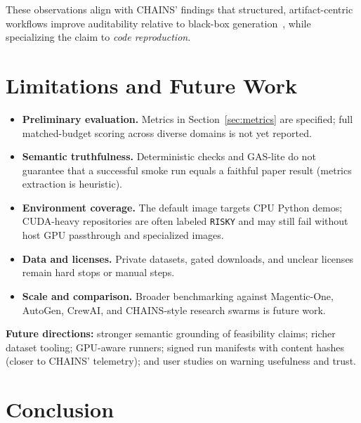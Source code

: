 \documentclass[11pt,a4paper]{article}
\begin{document}
These observations align with CHAINS' findings that structured, artifact-centric
workflows improve auditability relative to black-box generation~\cite{chains2026},
while specializing the claim to \emph{code reproduction}.

\section{Limitations and Future Work}
\label{sec:limits}

\begin{itemize}[leftmargin=*,itemsep=2pt]
  \item \textbf{Preliminary evaluation.} Metrics in Section~\ref{sec:metrics}
        are specified; full matched-budget scoring across diverse domains is
        not yet reported.
  \item \textbf{Semantic truthfulness.} Deterministic checks and GAS-lite do
        not guarantee that a successful smoke run equals a faithful paper
        result (metrics extraction is heuristic).
  \item \textbf{Environment coverage.} The default image targets CPU Python
        demos; CUDA-heavy repositories are often labeled \texttt{RISKY} and may
        still fail without host GPU passthrough and specialized images.
  \item \textbf{Data and licenses.} Private datasets, gated downloads, and
        unclear licenses remain hard stops or manual steps.
  \item \textbf{Scale and comparison.} Broader benchmarking against Magentic-One,
        AutoGen, CrewAI, and CHAINS-style research swarms is future work.
\end{itemize}

\noindent\textbf{Future directions:} stronger semantic grounding of feasibility
claims; richer dataset tooling; GPU-aware runners; signed run manifests with
content hashes (closer to CHAINS' telemetry); and user studies on warning
usefulness and trust.

\section{Conclusion}
\label{sec:conclusion}
\end{document}
